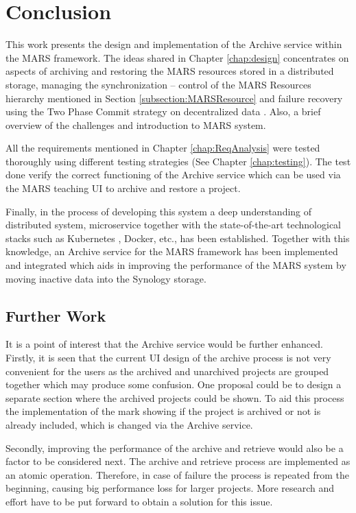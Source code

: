 \chapter{Conclusion}
This work presents the design and implementation of the Archive service within the MARS framework. The ideas shared
in Chapter \ref{chap:design} concentrates on aspects of archiving and restoring the MARS resources stored in a distributed storage, managing the synchronization
-- control of the MARS Resources hierarchy mentioned in Section \ref{subsection:MARSResource} and failure recovery using the Two Phase Commit strategy
on decentralized data \cite{atomic}.
Also, a brief overview of the challenges and introduction to MARS system.

All the requirements mentioned in Chapter \ref{chap:ReqAnalysis} were tested thoroughly using different testing strategies (See Chapter \ref{chap:testing}). The
test done verify the correct functioning of the Archive service which can be used via the MARS teaching UI to archive and restore a project.

Finally, in the process of developing this system a deep understanding of distributed system, microservice together with the state-of-the-art technological stacks
such as Kubernetes \cite{kubernetes}, Docker, etc., has been established. Together with this knowledge, an Archive service for the MARS framework has been implemented and integrated 
which aids in improving the performance of the MARS system by moving inactive data into the Synology storage.

\section{Further Work}
It is a point of interest that the Archive service would be further enhanced. Firstly, it is seen that the current UI design of the archive process is not very convenient
for the users as the archived and unarchived projects are grouped together which may produce some confusion. One proposal could be to design a separate section
where the archived projects could be shown. To aid this process the implementation of the mark showing if the project is archived or not is already included, which is
changed via the Archive service. 

Secondly, improving the performance of the archive and retrieve would also be a factor to be considered next. The archive and retrieve process are implemented as
an atomic operation. Therefore, in case of failure the process is repeated from the beginning, causing big performance loss for larger projects. More research and effort
have to be put forward to obtain a solution for this issue. 

